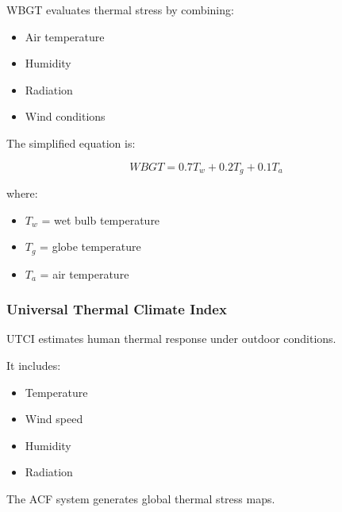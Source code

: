 WBGT evaluates thermal stress by combining:

\begin{itemize}

\item Air temperature

\item Humidity

\item Radiation

\item Wind conditions

\end{itemize}


The simplified equation is:

\[
WBGT=
0.7T_w+
0.2T_g+
0.1T_a
\]


where:

\begin{itemize}

\item $T_w$ = wet bulb temperature

\item $T_g$ = globe temperature

\item $T_a$ = air temperature

\end{itemize}



\subsubsection{Universal Thermal Climate Index}

UTCI estimates human thermal response under outdoor conditions.

It includes:

\begin{itemize}

\item Temperature

\item Wind speed

\item Humidity

\item Radiation

\end{itemize}


The ACF system generates global thermal stress maps.


